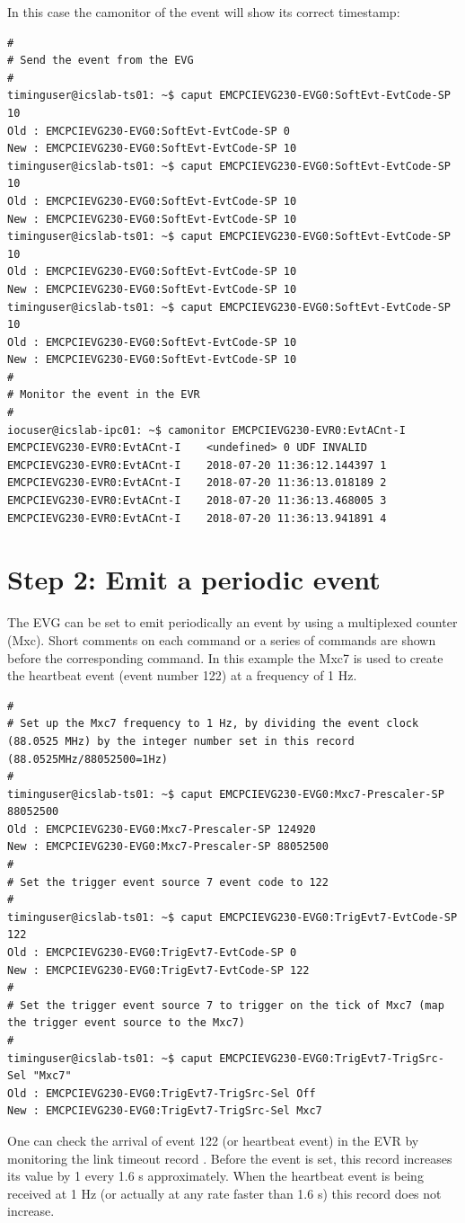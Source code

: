 \documentclass[11pt
  , a4paper
  , article
  , oneside
  , showtrims
]{memoir}
\begin{document}
In this case the camonitor of the event will show its correct timestamp:
\begin{lstlisting}[style=termstyle]
#
# Send the event from the EVG
#
timinguser@icslab-ts01: ~$ caput EMCPCIEVG230-EVG0:SoftEvt-EvtCode-SP 10
Old : EMCPCIEVG230-EVG0:SoftEvt-EvtCode-SP 0
New : EMCPCIEVG230-EVG0:SoftEvt-EvtCode-SP 10
timinguser@icslab-ts01: ~$ caput EMCPCIEVG230-EVG0:SoftEvt-EvtCode-SP 10
Old : EMCPCIEVG230-EVG0:SoftEvt-EvtCode-SP 10
New : EMCPCIEVG230-EVG0:SoftEvt-EvtCode-SP 10
timinguser@icslab-ts01: ~$ caput EMCPCIEVG230-EVG0:SoftEvt-EvtCode-SP 10
Old : EMCPCIEVG230-EVG0:SoftEvt-EvtCode-SP 10
New : EMCPCIEVG230-EVG0:SoftEvt-EvtCode-SP 10
timinguser@icslab-ts01: ~$ caput EMCPCIEVG230-EVG0:SoftEvt-EvtCode-SP 10
Old : EMCPCIEVG230-EVG0:SoftEvt-EvtCode-SP 10
New : EMCPCIEVG230-EVG0:SoftEvt-EvtCode-SP 10
#
# Monitor the event in the EVR
#
iocuser@icslab-ipc01: ~$ camonitor EMCPCIEVG230-EVR0:EvtACnt-I
EMCPCIEVG230-EVR0:EvtACnt-I    <undefined> 0 UDF INVALID
EMCPCIEVG230-EVR0:EvtACnt-I    2018-07-20 11:36:12.144397 1
EMCPCIEVG230-EVR0:EvtACnt-I    2018-07-20 11:36:13.018189 2
EMCPCIEVG230-EVR0:EvtACnt-I    2018-07-20 11:36:13.468005 3
EMCPCIEVG230-EVR0:EvtACnt-I    2018-07-20 11:36:13.941891 4
\end{lstlisting}


\section{Step 2: Emit a periodic event}
The EVG can be set to emit periodically an event by using a multiplexed counter (Mxc). Short comments on each command or a series of commands are shown before the corresponding command. In this example the Mxc7 is used to create the heartbeat event (event number 122) at a frequency of 1 Hz.
\begin{lstlisting}[style=termstyle]
#
# Set up the Mxc7 frequency to 1 Hz, by dividing the event clock (88.0525 MHz) by the integer number set in this record (88.0525MHz/88052500=1Hz)
#
timinguser@icslab-ts01: ~$ caput EMCPCIEVG230-EVG0:Mxc7-Prescaler-SP 88052500
Old : EMCPCIEVG230-EVG0:Mxc7-Prescaler-SP 124920
New : EMCPCIEVG230-EVG0:Mxc7-Prescaler-SP 88052500
#
# Set the trigger event source 7 event code to 122
#
timinguser@icslab-ts01: ~$ caput EMCPCIEVG230-EVG0:TrigEvt7-EvtCode-SP 122
Old : EMCPCIEVG230-EVG0:TrigEvt7-EvtCode-SP 0
New : EMCPCIEVG230-EVG0:TrigEvt7-EvtCode-SP 122
#
# Set the trigger event source 7 to trigger on the tick of Mxc7 (map the trigger event source to the Mxc7)
#
timinguser@icslab-ts01: ~$ caput EMCPCIEVG230-EVG0:TrigEvt7-TrigSrc-Sel "Mxc7"
Old : EMCPCIEVG230-EVG0:TrigEvt7-TrigSrc-Sel Off
New : EMCPCIEVG230-EVG0:TrigEvt7-TrigSrc-Sel Mxc7
\end{lstlisting}
One can check the arrival of event 122 (or heartbeat event) in the EVR by monitoring the link timeout record . Before the event is set, this record increases its value by 1 every 1.6 s approximately. When the heartbeat event is being received at 1 Hz (or actually at any rate faster than 1.6 s) this record does not increase.
\end{document}
